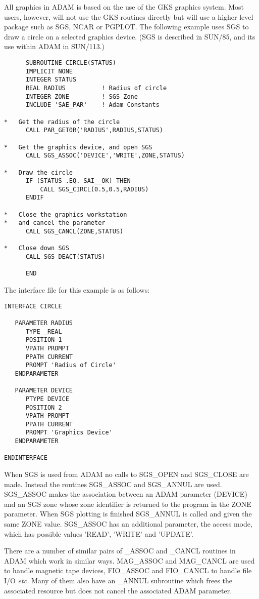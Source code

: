 \documentclass[twoside,11pt]{report}
\begin{document}
All graphics in ADAM is based on the use of the GKS graphics system. Most
users, however, will not use the GKS routines directly but will use a
higher level package such as SGS, NCAR or PGPLOT. The following example
uses SGS to draw a circle on a selected graphics device.
(SGS is described in SUN/85, and its use within ADAM in SUN/113.)
\begin{verbatim}
      SUBROUTINE CIRCLE(STATUS)
      IMPLICIT NONE
      INTEGER STATUS
      REAL RADIUS          ! Radius of circle
      INTEGER ZONE         ! SGS Zone
      INCLUDE 'SAE_PAR'    ! Adam Constants

*   Get the radius of the circle
      CALL PAR_GET0R('RADIUS',RADIUS,STATUS)

*   Get the graphics device, and open SGS
      CALL SGS_ASSOC('DEVICE','WRITE',ZONE,STATUS)

*   Draw the circle
      IF (STATUS .EQ. SAI__OK) THEN
          CALL SGS_CIRCL(0.5,0.5,RADIUS)
      ENDIF

*   Close the graphics workstation
*   and cancel the parameter
      CALL SGS_CANCL(ZONE,STATUS)

*   Close down SGS
      CALL SGS_DEACT(STATUS)

      END
\end{verbatim}

The interface file for this example is as follows:

\begin{verbatim}
INTERFACE CIRCLE

   PARAMETER RADIUS
      TYPE _REAL
      POSITION 1
      VPATH PROMPT
      PPATH CURRENT
      PROMPT 'Radius of Circle'
   ENDPARAMETER

   PARAMETER DEVICE
      PTYPE DEVICE
      POSITION 2
      VPATH PROMPT
      PPATH CURRENT
      PROMPT 'Graphics Device'
   ENDPARAMETER

ENDINTERFACE
\end{verbatim}

When SGS is used from ADAM no calls to SGS\_OPEN and SGS\_CLOSE are made.
Instead the routines SGS\_ASSOC and SGS\_ANNUL are used. SGS\_ASSOC makes
the association between an ADAM parameter (DEVICE) and an SGS zone whose
zone identifier is returned to the program in the ZONE parameter. When
SGS plotting is finished SGS\_ANNUL is called and given the same ZONE
value. SGS\_ASSOC has an additional parameter, the access mode, which has
possible values 'READ', 'WRITE' and 'UPDATE'.

There are a number of similar pairs of \_ASSOC and \_CANCL routines in ADAM
which work in similar ways. MAG\_ASSOC and MAG\_CANCL are used to handle
magnetic tape devices, FIO\_ASSOC and FIO\_CANCL to handle file I/O {\em etc.}
Many of them also have an \_ANNUL subroutine which frees the associated
resource but does not cancel the associated ADAM parameter.
\end{document}
